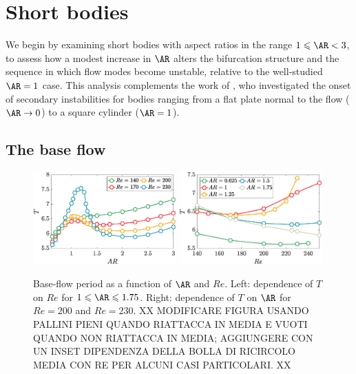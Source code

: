 \section{Short bodies}
\label{sec:short}

We begin by examining short bodies with aspect ratios in the range $1 \le \AR <3$, to assess how a modest increase in $\AR$ alters the bifurcation structure and the sequence in which flow modes become unstable, relative to the well-studied $\AR=1$ case. This analysis complements the work of \cite{choi-yang-2014}, who investigated the onset of secondary instabilities for bodies ranging from a flat plate normal to the flow ($\AR \rightarrow 0$) to a square cylinder ($\AR=1$).

\subsection{The base flow}

\begin{figure}
  \centering
  \includegraphics[width=0.49\textwidth]{./fig/AR1s/T_AR.eps}
  \includegraphics[width=0.49\textwidth]{./fig/AR1s/T_Re.eps}
  \caption{Base-flow period as a function of $\AR$ and $Re$. Left: dependence of $T$ on $Re$ for $1 \le \AR \le 1.75$. Right: dependence of $T$ on $\AR$ for $Re=200$ and $Re=230$. XX MODIFICARE FIGURA USANDO PALLINI PIENI QUANDO RIATTACCA IN MEDIA E VUOTI QUANDO NON RIATTACCA IN MEDIA; AGGIUNGERE CON UN INSET DIPENDENZA DELLA BOLLA DI RICIRCOLO MEDIA CON RE PER ALCUNI CASI PARTICOLARI. XX}
  \label{fig:T_Re_small}
\end{figure}
%

